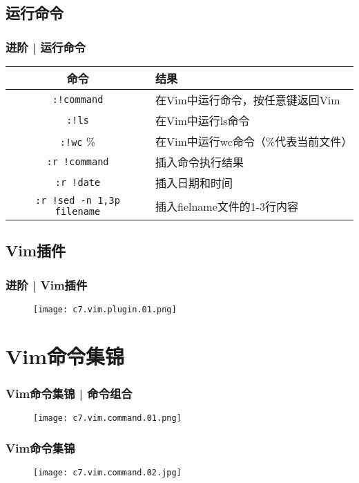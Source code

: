 \subsection{运行命令}
\begin{frame}[fragile]
  \frametitle{进阶 | \alert{运行命令}}
  \begin{table}
    \centering
    \begin{tabularx}{\textwidth}{cX}
      \hline
      \rowcolor{blue!50}命令 & 结果\\
      \hline
      \verb|:!command| & 在Vim中运行命令，按任意键返回Vim\\
      \verb|:!ls| & 在Vim中运行ls命令\\
      \hline
      \verb|:!wc| \% & 在Vim中运行wc命令（\%代表当前文件）\\
      \hline
      \verb|:r !command| & 插入命令执行结果\\
      \verb|:r !date| & 插入日期和时间\\
      \verb|:r !sed -n 1,3p filename| & 插入fielname文件的1-3行内容\\
      \hline
    \end{tabularx}
  \end{table}
\end{frame}

\subsection{Vim插件}
\begin{frame}
  \frametitle{进阶 | Vim插件}
  \begin{figure}
    \centering
    \texttt{[image: c7.vim.plugin.01.png]}
  \end{figure}
\end{frame}

\section{Vim命令集锦}
\begin{frame}
  \frametitle{Vim命令集锦 | 命令组合}
  \begin{figure}
    \centering
    \texttt{[image: c7.vim.command.01.png]}
  \end{figure}
\end{frame}

\begin{frame}
  \frametitle{Vim命令集锦}
  \begin{figure}
    \centering
    \texttt{[image: c7.vim.command.02.jpg]}
  \end{figure}
\end{frame}

